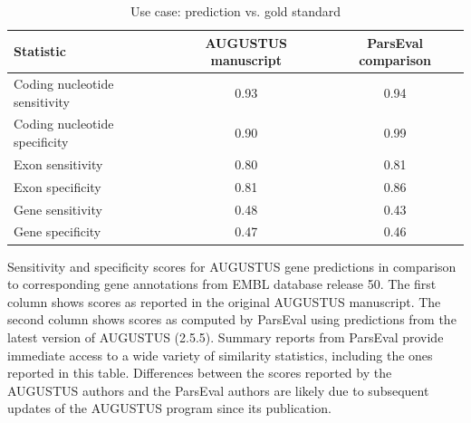 \begin{table}
\caption{Use case: prediction vs. gold standard}
\begin{tabularx}{\textwidth}{lcc}
\hline
  Statistic                     & AUGUSTUS manuscript & ParsEval comparison \\ \hline
  Coding nucleotide sensitivity & 0.93                & 0.94                \\
  Coding nucleotide specificity & 0.90                & 0.99                \\
  Exon sensitivity              & 0.80                & 0.81                \\
  Exon specificity              & 0.81                & 0.86                \\
  Gene sensitivity              & 0.48                & 0.43                \\
  Gene specificity              & 0.47                & 0.46                \\ \hline
\end{tabularx}
\label{Table:AugustusUseCase}
\raggedright
{\scriptsize
Sensitivity and specificity scores for AUGUSTUS gene predictions in comparison
to corresponding gene annotations from EMBL database release 50. The first
column shows scores as reported in the original AUGUSTUS manuscript. The
second column shows scores as computed by ParsEval using predictions from
the latest version of AUGUSTUS (2.5.5). Summary reports from ParsEval provide
immediate access to a wide variety of similarity statistics, including the ones
reported in this table. Differences between the scores reported by the
AUGUSTUS authors and the ParsEval authors are likely due to subsequent
updates of the AUGUSTUS program since its publication.
}
\end{table}


